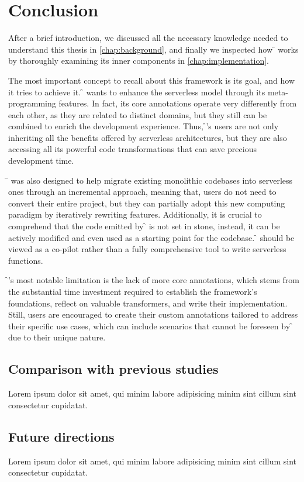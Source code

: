 \chapter{Conclusion}
\label{chap:conclusion}

After a brief introduction, we discussed all the necessary knowledge needed
to understand this thesis in \cref{chap:background}, and finally we inspected
how \f{} works by thoroughly examining its inner components in \cref{chap:implementation}.

The most important concept to recall about this framework is its goal,
and how it tries to achieve it.
\f{} wants to enhance the serverless model through its meta-programming
features. In fact, its core annotations operate very differently from each other,
as they are related to distinct domains, but they still can be combined
to enrich the development experience.
Thus, \f{}'s users are not only inheriting all the
benefits offered by serverless architectures,
but they are also accessing all its powerful code
transformations that can save precious development time.

\f{} was also designed to help migrate existing
monolithic codebases into serverless ones through an incremental approach,
meaning that, users do not need to convert their entire project, but they
can partially adopt this new computing paradigm by iteratively rewriting features.
Additionally, it is crucial to comprehend that the code
emitted by \f{} is not set in stone, instead, it can be actively modified
and even used as a starting point for the codebase.
\f{} should be viewed as a co-pilot rather than a fully comprehensive tool to write serverless functions.

\f{}'s most notable limitation is the lack of more core annotations,
which stems from the substantial time investment required
to establish the framework's foundations, reflect on valuable transformers, and write their implementation.
Still, users are encouraged to create their custom annotations
tailored to address their specific use cases, which can include scenarios
that cannot be foreseen by \f{} due to their unique nature.

\section{Comparison with previous studies}

Lorem ipsum dolor sit amet, qui minim labore adipisicing minim sint cillum sint consectetur cupidatat.

\section{Future directions}

Lorem ipsum dolor sit amet, qui minim labore adipisicing minim sint cillum sint consectetur cupidatat.
